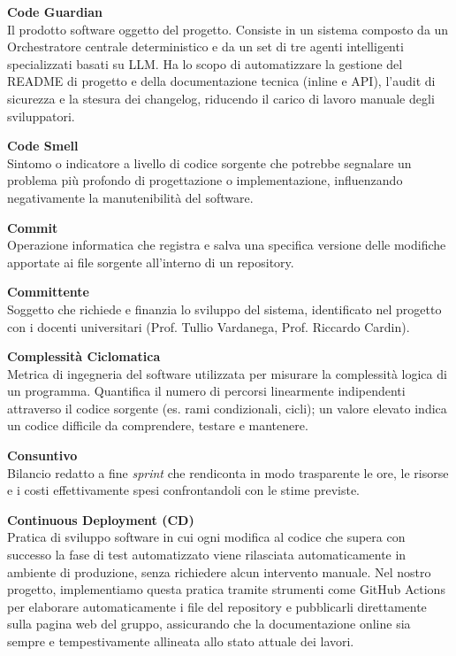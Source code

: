 \documentclass[12pt, a4paper]{article}
\begin{document}
\noindent\hypertarget{code-guardian}{\textbf{Code Guardian}} \\[0.1em]
Il prodotto software oggetto del progetto. Consiste in un sistema composto da un Orchestratore centrale deterministico e da un set di tre agenti intelligenti specializzati basati su LLM. Ha lo scopo di automatizzare la gestione del README di progetto e della documentazione tecnica (inline e API), l'audit di sicurezza e la stesura dei changelog, riducendo il carico di lavoro manuale degli sviluppatori.
\vspace{0.5cm}

\noindent\hypertarget{code-smell}{\textbf{Code Smell}} \\[0.1em]
Sintomo o indicatore a livello di codice sorgente che potrebbe segnalare un problema più profondo di progettazione o implementazione, influenzando negativamente la manutenibilità del software.
\vspace{0.5cm}  

\noindent\hypertarget{commit}{\textbf{Commit}} \\[0.1em]
Operazione informatica che registra e salva una specifica versione delle modifiche apportate ai file sorgente all'interno di un repository.
\vspace{0.5cm}

\noindent\hypertarget{Committente}{\textbf{Committente}} \\[0.1em]
Soggetto che richiede e finanzia lo sviluppo del sistema, identificato nel progetto con i docenti universitari (Prof. Tullio Vardanega, Prof. Riccardo Cardin).
\vspace{0.5cm}

\noindent\hypertarget{complessità-ciclomatica}{\textbf{Complessità Ciclomatica}} \\[0.1em]
Metrica di ingegneria del software utilizzata per misurare la complessità logica di un programma. Quantifica il numero di percorsi linearmente indipendenti attraverso il codice sorgente (es. rami condizionali, cicli); un valore elevato indica un codice difficile da comprendere, testare e mantenere.
\vspace{0.5cm}

\noindent\hypertarget{consuntivo}{\textbf{Consuntivo}} \\[0.1em]
Bilancio redatto a fine \textit{sprint} che rendiconta in modo trasparente le ore, le risorse e i costi effettivamente spesi confrontandoli con le stime previste.
\vspace{0.5cm}

\noindent\hypertarget{continuous-deployment}{\textbf{Continuous Deployment (CD)}} \\[0.1em]
Pratica di sviluppo software in cui ogni modifica al codice che supera con successo la fase di test automatizzato viene rilasciata automaticamente in ambiente di produzione, senza richiedere alcun intervento manuale. Nel nostro progetto, implementiamo questa pratica tramite strumenti come GitHub Actions per elaborare automaticamente i file del repository e pubblicarli direttamente sulla pagina web del gruppo, assicurando che la documentazione online sia sempre e tempestivamente allineata allo stato attuale dei lavori.
\vspace{0.5cm}
\end{document}
